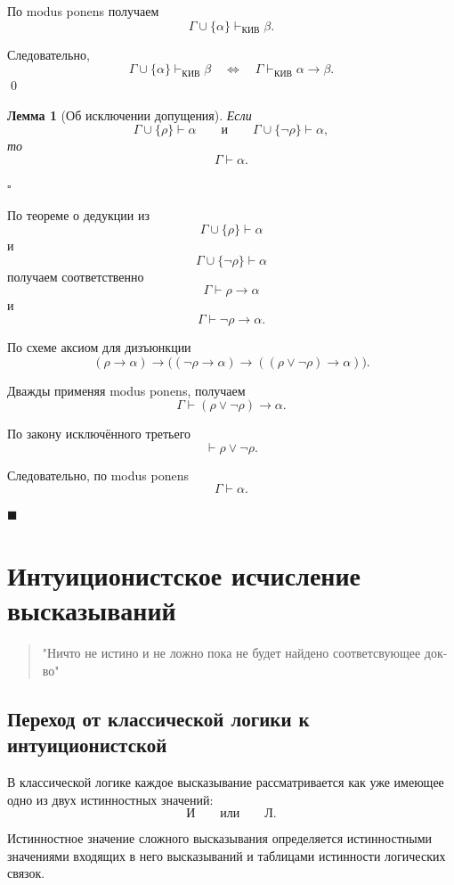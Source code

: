 \documentclass[12pt,a4paper,oneside,openany]{book}
\theoremstyle{definition}
\theoremstyle{plain}
\newtheorem{lemma}{Лемма}[chapter]
\theoremstyle{remark}
\begin{document}
По modus ponens получаем
\[
\Gamma\cup\{\alpha\}\vdash_{\mathrm{КИВ}}\beta.
\]

Следовательно,
\[
\boxed{
\Gamma\cup\{\alpha\}\vdash_{\mathrm{КИВ}}\beta
\quad\Longleftrightarrow\quad
\Gamma\vdash_{\mathrm{КИВ}}\alpha\to\beta
}.
\]
\qed

\begin{lemma}[Об исключении допущения]
Если
\[
\Gamma\cup\{\rho\}\vdash\alpha
\qquad\text{и}\qquad
\Gamma\cup\{\neg\rho\}\vdash\alpha,
\]
то
\[
\Gamma\vdash\alpha.
\]
\end{lemma}

$\square$

По теореме о дедукции из
\[
\Gamma\cup\{\rho\}\vdash\alpha
\]
и
\[
\Gamma\cup\{\neg\rho\}\vdash\alpha
\]
получаем соответственно
\[
\Gamma\vdash\rho\to\alpha
\]
и
\[
\Gamma\vdash\neg\rho\to\alpha.
\]

По схеме аксиом для дизъюнкции
\[
(\rho\to\alpha)
\to
\bigl(
(\neg\rho\to\alpha)
\to
((\rho\lor\neg\rho)\to\alpha)
\bigr).
\]

Дважды применяя modus ponens, получаем
\[
\Gamma\vdash(\rho\lor\neg\rho)\to\alpha.
\]

По закону исключённого третьего
\[
\vdash\rho\lor\neg\rho.
\]

Следовательно, по modus ponens
\[
\Gamma\vdash\alpha.
\]

$\blacksquare$







\section{Интуиционистское исчисление высказываний}
\begin{quote}
    "Ничто не истино и не ложно пока не будет найдено соответсвующее док-во"
\end{quote}


\subsection{Переход от классической логики к интуиционистской}

В классической логике каждое высказывание рассматривается как уже
имеющее одно из двух истинностных значений:
\[
\text{И}
\qquad\text{или}\qquad
\text{Л}.
\]

Истинностное значение сложного высказывания определяется
истинностными значениями входящих в него высказываний и таблицами
истинности логических связок.
\end{document}
